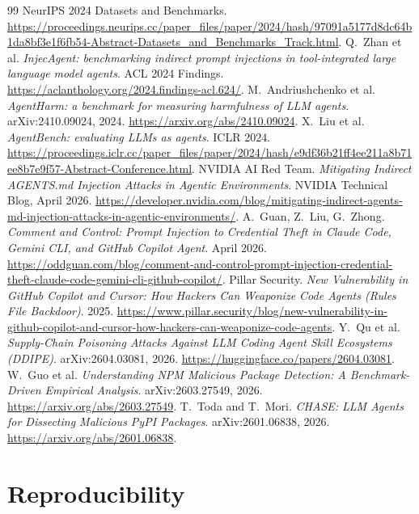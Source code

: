 \documentclass[11pt,letterpaper]{article}
\begin{document}
\begin{thebibliography}{99}
NeurIPS 2024 Datasets and Benchmarks.
\url{https://proceedings.neurips.cc/paper_files/paper/2024/hash/97091a5177d8dc64b1da8bf3e1f6fb54-Abstract-Datasets_and_Benchmarks_Track.html}.
Q.~Zhan et al.
\textit{InjecAgent: benchmarking indirect prompt injections in tool-integrated large language model agents}.
ACL 2024 Findings.
\url{https://aclanthology.org/2024.findings-acl.624/}.
M.~Andriushchenko et al.
\textit{AgentHarm: a benchmark for measuring harmfulness of LLM agents}.
arXiv:2410.09024, 2024. \url{https://arxiv.org/abs/2410.09024}.
X.~Liu et al.
\textit{AgentBench: evaluating LLMs as agents}.
ICLR 2024.
\url{https://proceedings.iclr.cc/paper_files/paper/2024/hash/e9df36b21ff4ee211a8b71ee8b7e9f57-Abstract-Conference.html}.
NVIDIA AI Red Team.
\textit{Mitigating Indirect AGENTS.md Injection Attacks in Agentic Environments}.
NVIDIA Technical Blog, April 2026.
\url{https://developer.nvidia.com/blog/mitigating-indirect-agents-md-injection-attacks-in-agentic-environments/}.
A.~Guan, Z.~Liu, G.~Zhong.
\textit{Comment and Control: Prompt Injection to Credential Theft in Claude Code, Gemini CLI, and GitHub Copilot Agent}.
April 2026. \url{https://oddguan.com/blog/comment-and-control-prompt-injection-credential-theft-claude-code-gemini-cli-github-copilot/}.
Pillar Security.
\textit{New Vulnerability in GitHub Copilot and Cursor: How Hackers Can Weaponize Code Agents (Rules File Backdoor)}.
2025. \url{https://www.pillar.security/blog/new-vulnerability-in-github-copilot-and-cursor-how-hackers-can-weaponize-code-agents}.
Y.~Qu et al.
\textit{Supply-Chain Poisoning Attacks Against LLM Coding Agent Skill Ecosystems (DDIPE)}.
arXiv:2604.03081, 2026. \url{https://huggingface.co/papers/2604.03081}.
W.~Guo et al.
\textit{Understanding NPM Malicious Package Detection: A Benchmark-Driven Empirical Analysis}.
arXiv:2603.27549, 2026. \url{https://arxiv.org/abs/2603.27549}.
T.~Toda and T.~Mori.
\textit{CHASE: LLM Agents for Dissecting Malicious PyPI Packages}.
arXiv:2601.06838, 2026. \url{https://arxiv.org/abs/2601.06838}.
\end{thebibliography}

\appendix
\section{Reproducibility}\label{sec:repro}
\end{document}
